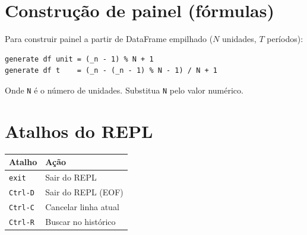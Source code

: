 \section{Construção de painel (fórmulas)}

Para construir painel a partir de DataFrame empilhado ($N$ unidades, $T$ períodos):

\begin{lstlisting}[style=inline]
generate df unit = (_n - 1) % N + 1
generate df t    = (_n - (_n - 1) % N - 1) / N + 1
\end{lstlisting}

Onde \texttt{N} é o número de unidades. Substitua \texttt{N} pelo valor numérico.

\section{Atalhos do REPL}

\begin{center}
\begin{tabular}{ll}
\toprule
\textbf{Atalho}  & \textbf{Ação} \\
\midrule
\texttt{exit}    & Sair do REPL \\
\texttt{Ctrl-D}  & Sair do REPL (EOF) \\
\texttt{Ctrl-C}  & Cancelar linha atual \\
\texttt{Ctrl-R}  & Buscar no histórico \\
\bottomrule
\end{tabular}
\end{center}
